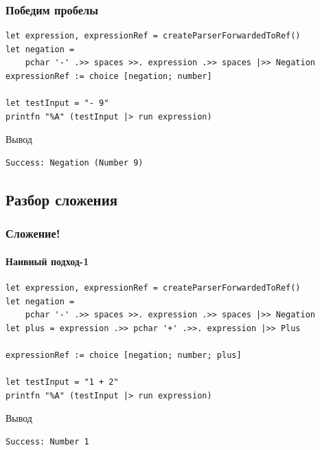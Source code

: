 \documentclass[xetex,mathserif,serif]{beamer}
\begin{document}
    \begin{frame}[fragile]
        \frametitle{Победим пробелы}
        \begin{verbatim}
let expression, expressionRef = createParserForwardedToRef()
let negation = 
    pchar '-' .>> spaces >>. expression .>> spaces |>> Negation
expressionRef := choice [negation; number]

let testInput = "- 9"
printfn "%A" (testInput |> run expression)
        \end{verbatim}

        \begin{exampleblock}{Вывод}
            \begin{verbatim}
Success: Negation (Number 9)
            \end{verbatim}
        \end{exampleblock}
    \end{frame}

    \subsection{Разбор сложения}

    \begin{frame}[fragile]
        \frametitle{Сложение!}
        \framesubtitle{Наивный подход-1}
        \begin{verbatim}
let expression, expressionRef = createParserForwardedToRef()
let negation = 
    pchar '-' .>> spaces >>. expression .>> spaces |>> Negation
let plus = expression .>> pchar '+' .>>. expression |>> Plus

expressionRef := choice [negation; number; plus]

let testInput = "1 + 2"
printfn "%A" (testInput |> run expression)
        \end{verbatim}

        \begin{exampleblock}{Вывод}
            \begin{verbatim}
Success: Number 1
            \end{verbatim}
        \end{exampleblock}
    \end{frame}
\end{document}
